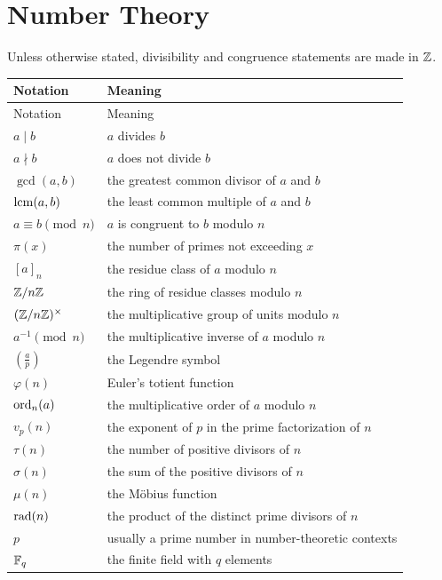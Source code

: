     \section*{Number Theory}

    Unless otherwise stated, divisibility and congruence statements are made in
    $\mathbb{Z}$.

    \vspace{0.5em}

    {\small
    \renewcommand{\arraystretch}{1.18}
    \begin{longtable}{@{}L{0.27\textwidth}L{0.65\textwidth}@{}}
        \toprule
        Notation & Meaning \\
        \midrule
        \endfirsthead

        \toprule
        Notation & Meaning \\
        \midrule
        \endhead

        \bottomrule
        \endlastfoot

        $a\mid b$ & $a$ divides $b$ \\
        $a\nmid b$ & $a$ does not divide $b$ \\
        $\gcd(a,b)$ & the greatest common divisor of $a$ and $b$ \\
        $\operatorname{lcm}(a,b)$ & the least common multiple of $a$ and $b$ \\
        $a\equiv b\pmod n$ & $a$ is congruent to $b$ modulo $n$ \\
        $\pi(x)$ & the number of primes not exceeding $x$ \\
        $[a]_n$ & the residue class of $a$ modulo $n$ \\
        $\mathbb{Z}/n\mathbb{Z}$ & the ring of residue classes modulo $n$ \\
        $(\mathbb{Z}/n\mathbb{Z})^\times$ & the multiplicative group of units modulo $n$ \\
        $a^{-1}\pmod n$ & the multiplicative inverse of $a$ modulo $n$ \\
        $\left(\frac{a}{p}\right)$ & the Legendre symbol \\
        $\varphi(n)$ & Euler's totient function \\
        $\operatorname{ord}_n(a)$ & the multiplicative order of $a$ modulo $n$ \\
        $v_p(n)$ & the exponent of $p$ in the prime factorization of $n$ \\
        $\tau(n)$ & the number of positive divisors of $n$ \\
        $\sigma(n)$ & the sum of the positive divisors of $n$ \\
        $\mu(n)$ & the M\"obius function \\
        $\operatorname{rad}(n)$ & the product of the distinct prime divisors of $n$ \\
        $p$ & usually a prime number in number-theoretic contexts \\
        $\mathbb{F}_q$ & the finite field with $q$ elements \\
    \end{longtable}
    }

